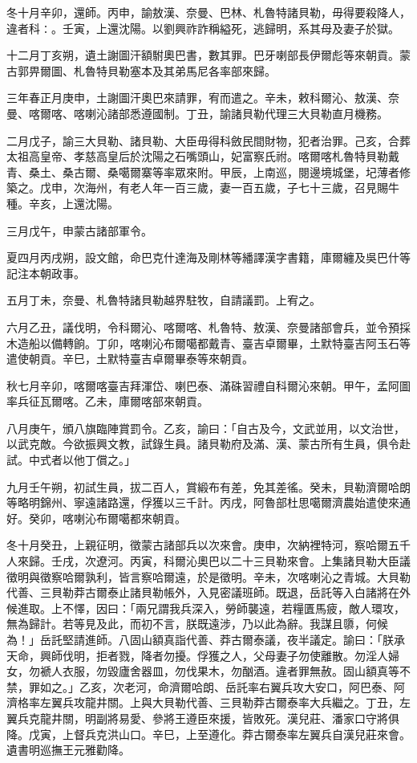 \begin{pinyinscope}
冬十月辛卯，還師。丙申，諭敖漢、奈曼、巴林、札魯特諸貝勒，毋得要殺降人，違者科∶。壬寅，上還沈陽。以劉興祚詐稱縊死，逃歸明，系其母及妻子於獄。

十二月丁亥朔，遺土謝圖汗額駙奧巴書，數其罪。巴牙喇部長伊爾彪等來朝貢。蒙古郭畀爾圖、札魯特貝勒塞本及其弟馬尼各率部來歸。

三年春正月庚申，土謝圖汗奧巴來請罪，宥而遣之。辛未，敕科爾沁、敖漢、奈曼、喀爾喀、喀喇沁諸部悉遵國制。丁丑，諭諸貝勒代理三大貝勒直月機務。

二月戊子，諭三大貝勒、諸貝勒、大臣毋得科斂民間財物，犯者治罪。己亥，合葬太祖高皇帝、孝慈高皇后於沈陽之石嘴頭山，妃富察氏祔。喀爾喀札魯特貝勒戴青、桑土、桑古爾、桑噶爾寨等率眾來附。甲辰，上南巡，閱邊境城堡，圮薄者修築之。戊申，次海州，有老人年一百三歲，妻一百五歲，子七十三歲，召見賜牛種。辛亥，上還沈陽。

三月戊午，申蒙古諸部軍令。

夏四月丙戌朔，設文館，命巴克什達海及剛林等繙譯漢字書籍，庫爾纏及吳巴什等記注本朝政事。

五月丁未，奈曼、札魯特諸貝勒越界駐牧，自請議罰。上宥之。

六月乙丑，議伐明，令科爾沁、喀爾喀、札魯特、敖漢、奈曼諸部會兵，並令預採木造船以備轉餉。丁卯，喀喇沁布爾噶都戴青、臺吉卓爾畢，土默特臺吉阿玉石等遣使朝貢。辛巳，土默特臺吉卓爾畢泰等來朝貢。

秋七月辛卯，喀爾喀臺吉拜渾岱、喇巴泰、滿硃習禮自科爾沁來朝。甲午，孟阿圖率兵征瓦爾喀。乙未，庫爾喀部來朝貢。

八月庚午，頒八旗臨陣賞罰令。乙亥，諭曰：「自古及今，文武並用，以文治世，以武克敵。今欲振興文教，試錄生員。諸貝勒府及滿、漢、蒙古所有生員，俱令赴試。中式者以他丁償之。」

九月壬午朔，初試生員，拔二百人，賞緞布有差，免其差徭。癸未，貝勒濟爾哈朗等略明錦州、寧遠諸路還，俘獲以三千計。丙戌，阿魯部杜思噶爾濟農始遣使來通好。癸卯，喀喇沁布爾噶都來朝貢。

冬十月癸丑，上親征明，徵蒙古諸部兵以次來會。庚申，次納裡特河，察哈爾五千人來歸。壬戌，次遼河。丙寅，科爾沁奧巴以二十三貝勒來會。上集諸貝勒大臣議徵明與徵察哈爾孰利，皆言察哈爾遠，於是徵明。辛未，次喀喇沁之青城。大貝勒代善、三貝勒莽古爾泰止諸貝勒帳外，入見密議班師。既退，岳託等入白諸將在外候進取。上不懌，因曰：「兩兄謂我兵深入，勞師襲遠，若糧匱馬疲，敵人環攻，無為歸計。若等見及此，而初不言，朕既遠涉，乃以此為辭。我謀且隳，何候為！」岳託堅請進師。八固山額真詣代善、莽古爾泰議，夜半議定。諭曰：「朕承天命，興師伐明，拒者戮，降者勿擾。俘獲之人，父母妻子勿使離散。勿淫人婦女，勿褫人衣服，勿毀廬舍器皿，勿伐果木，勿酗酒。違者罪無赦。固山額真等不禁，罪如之。」乙亥，次老河，命濟爾哈朗、岳託率右翼兵攻大安口，阿巴泰、阿濟格率左翼兵攻龍井關。上與大貝勒代善、三貝勒莽古爾泰率大兵繼之。丁丑，左翼兵克龍井關，明副將易愛、參將王遵臣來援，皆敗死。漢兒莊、潘家口守將俱降。戊寅，上督兵克洪山口。辛巳，上至遵化。莽古爾泰率左翼兵自漢兒莊來會。遺書明巡撫王元雅勸降。


\end{pinyinscope}

